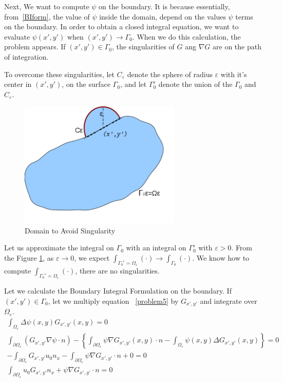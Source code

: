 \documentclass[a4paper,12pt]{article}
\newcommand{\integ}[3]{%
\ensuremath{\displaystyle{\int^{#2}_{#1} #3}}}
\begin{document}
Next, We want to compute $\psi$ on the boundary. It is because essentially, from~\eqref{BIform}, the value of $\psi$ inside the domain, depend on the values 
$\psi$ terms on the boundary. In order to obtain a closed integral equation, we want to evaluate $\psi(x',y')$
when $(x',y')\to\Gamma_0$. When we do this calculation, the problem appears. If $(x',y')\in\Gamma_0$, the singularities of $G$ ang $\nabla G$ are on the path 
of integration.

To overcome these singularities, let $C_\varepsilon$ denote the sphere of radius $\varepsilon$ with it's center in $(x',y')$, on the surface $\Gamma_0$, 
and let $\Gamma_0^\varepsilon$ denote the union of the $\Gamma_0$ and $C_\varepsilon$. 
\begin{figure}[!htbp]
\begin{center}
\includegraphics[height = 6cm]{lingkaran2.png}
\end{center}
 \caption{Domain to Avoid Singularity}\label{obstacleEpsilon}
\end{figure}

Let us approximate the integral on $\Gamma_0$ with an integral on $\Gamma_0^\varepsilon$
with $\varepsilon >0$.
From the Figure \ref{obstacleEpsilon}, as $\varepsilon\to0$, we expect $\integ{{\Gamma_0}^\varepsilon=\Omega_\varepsilon}{}{(\cdot)}\to\integ{\Gamma_0}{}{(\cdot)}$.
We know how to compute $\integ{{\Gamma_0}^\varepsilon=\Omega_\varepsilon}{}{(\cdot)}$, there are no singularities.

Let we calculate the Boundary Integral Formulation on the boundary. If $(x',y')\in \Gamma_0$, let we multiply equation
~\eqref{problem5} by $G_{x',y'} $ and integrate over $\Omega_\varepsilon$.
\begin{align}
\integ{\Omega_\varepsilon}{}{ \Delta \psi(x,y) G_{x',y'}(x,y)}=0\\
\integ{\partial\Omega_\varepsilon}{}{(G_{x',y'}\nabla \psi \cdot n) }-
\left\{\integ{\partial\Omega_\varepsilon}{}{\psi \nabla G_{x',y'}(x,y)\cdot n }-
\integ{\Omega_\varepsilon}{}{\psi (x,y)\Delta G_{x',y'}(x,y) }\right\}=0 \\
-\integ{\partial\Omega_\varepsilon}{}{G_{x',y'}u_0 n_x}-\integ{\partial\Omega_\varepsilon}{}{\psi \nabla G_{x',y'}\cdot n}+0=0\\
\integ{\partial\Omega_\varepsilon}{}{u_0 G_{x',y'}n_x+\psi \nabla G_{x',y'}\cdot n} =0 \label{BIboundary}
\end{align}
\end{document}
